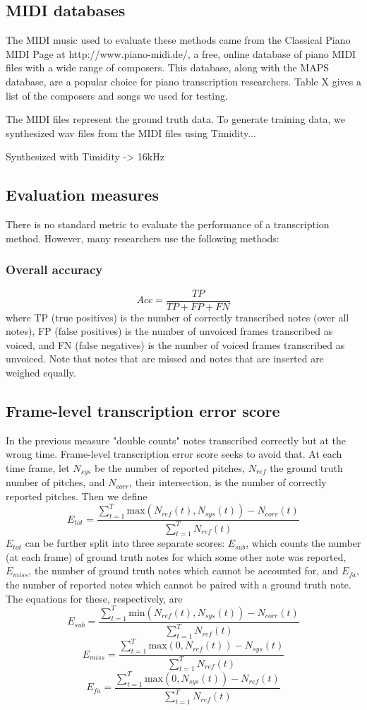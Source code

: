 \documentclass[5p]{elsarticle}
\begin{document}
\subsection{MIDI databases}

The MIDI music used to evaluate these methods came from the Classical Piano MIDI Page at http://www.piano-midi.de/, a free, online database of piano MIDI files with a wide range of composers. This database, along with the MAPS database, are a popular choice for piano transcription researchers. Table X gives a list of the composers and songs we used for testing. 

The MIDI files represent the ground truth data. To generate training data, we synthesized wav files from the MIDI files using Timidity...

Synthesized with Timidity -> 16kHz


\subsection{Evaluation measures}


There is no standard metric to evaluate the performance of a transcription method. However, many researchers use the following methods:

\subsubsection{Overall accuracy}
$$Acc = \frac{TP}{TP+FP+FN} $$
where TP (true positives) is the number of correctly transcribed notes (over all notes), FP (false positives) is the number of unvoiced frames transcribed as voiced, and FN (false negatives) is the number of voiced frames transcribed as unvoiced. Note that notes that are missed and notes that are inserted are weighed equally.
\subsection{Frame-level transcription error score}
In the previous measure "double counts" notes transcribed correctly but at the wrong time.  Frame-level transcription error score seeks to avoid that.
At each time frame, let $N_{sys}$ be the number of reported pitches, $N_{ref}$ the ground truth number of pitches, and $N_{corr}$, their intersection, is the number of correctly reported pitches.  Then we define 
$$E_{tot}=\frac{\sum_{t=1}^T \text{max}(N_{ref}(t),N_{sys}(t))-N_{corr}(t)}{\sum_{t=1}^T N_{ref}(t)}$$
$E_{tot}$ can be further split into three separate scores: $E_{sub}$, which counts the number (at each frame) of ground truth notes for which some other note was reported, $E_{miss}$, the number of ground truth notes which cannot be accounted for, and $E_{fa}$, the number of reported notes which cannot be paired with a ground truth note.  The equations for these, respectively, are 
$$E_{sub}=\frac{\sum_{t=1}^T \text{min}(N_{ref}(t),N_{sys}(t))-N_{corr}(t)}{\sum_{t=1}^T N_{ref}(t)}$$
$$E_{miss}=\frac{\sum_{t=1}^T \text{max}(0,N_{ref}(t))-N_{sys}(t)}{\sum_{t=1}^T N_{ref}(t)}$$
$$E_{fa}=\frac{\sum_{t=1}^T \text{max}(0,N_{sys}(t))-N_{ref}(t)}{\sum_{t=1}^T N_{ref}(t)}$$
\end{document}
